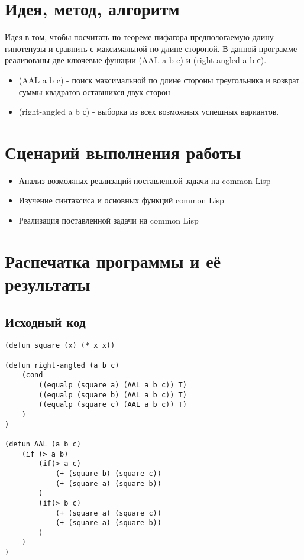 \documentclass[12pt]{article}
\begin{document}
\section{Идея, метод, алгоритм}
Идея в том, чтобы посчитать по теореме пифагора предпологаемую длину гипотенузы и сравнить с максимальной по длине стороной. В данной программе реализованы две ключевые функции (AAL a b c) и (right-angled a b с).
\begin{itemize}
\setlength{\itemsep}{-1mm} %
\item (AAL a b c) - поиск максимальной по длине стороны треугольника и возврат суммы квадратов оставшихся двух сторон
\item (right-angled a b с) - выборка из всех возможных успешных вариантов.
\end{itemize}

\section{Сценарий выполнения работы}
\begin{itemize}
\setlength{\itemsep}{-1mm}
\item Анализ возможных реализаций поставленной задачи на common Lisp
\item Изучение синтаксиса и основных функций common Lisp
\item Реализация поставленной задачи на common Lisp
\end{itemize}
\section{Распечатка программы и её результаты}

\subsection{Исходный код}
\begin{verbatim}
(defun square (x) (* x x))

(defun right-angled (a b c)
    (cond
        ((equalp (square a) (AAL a b c)) T)
        ((equalp (square b) (AAL a b c)) T)
        ((equalp (square c) (AAL a b c)) T)
    )
)

(defun AAL (a b c)
    (if (> a b)
        (if(> a c)
            (+ (square b) (square c))
            (+ (square a) (square b))
        )
        (if(> b c)
            (+ (square a) (square c))
            (+ (square a) (square b))
        )
    )
)
\end{verbatim}
%
\end{document}
